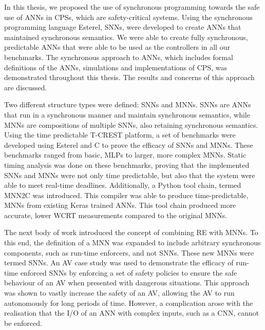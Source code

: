 In this thesis, we proposed the use of synchronous programming towards the safe use of \acp{ANN} in \acp{CPS}, which are safety-critical systems.
Using the synchronous programming language Esterel, \acp{SNN}, were developed to create \acp{ANN} that maintained synchronous semantics.
We were able to create fully synchronous, predictable \acp{ANN} that were able to be used as the controllers in all our benchmarks.
The synchronous approach to \acp{ANN}, which includes formal definitions of the \acp{ANN}, simulations and implementations of \ac{CPS}, was demonstrated throughout this thesis.
The results and concerns of this approach are discussed.

Two different structure types were defined: \acp{SNN} and \acp{MNN}.
\acp{SNN} are \acp{ANN} that run in a synchronous manner and maintain synchronous semantics, while \acp{MNN} are compositions of multiple \acp{SNN}, also retaining synchronous semantics.
Using the time predictable T-CREST platform, a set of benchmarks were developed using Esterel and C to prove the efficacy of \acp{SNN} and \acp{MNN}. 
These benchmarks ranged from basic, \acp{MLP} to larger, more complex \acp{MNN}.
Static timing analysis was done on these benchmarks, proving that the implemented \acp{SNN} and \acp{MNN} were not only time predictable, but also that the system were able to meet real-time deadlines.
Additionally, a Python tool chain, termed \ac{MNN2C} was introduced.
This compiler was able to produce time-predictable, \acp{MNN} from existing Keras trained \acp{ANN}.
This tool chain produced more accurate, lower \ac{WCRT} measurements compared to the original \acp{MNN}.

The next body of work introduced the concept of combining \ac{RE} with \acp{MNN}.
To this end, the definition of a \ac{MNN} was expanded to include arbitrary synchronous components, such as run-time enforcers, and not \acp{SNN}.
These new \acp{MNN} were termed \acp{SNN}.
An \ac{AV} case study was used to demonstrate the efficacy of run-time enforced \acp{SNN} by enforcing a set of safety policies to ensure the safe behaviour of an \ac{AV} when presented with dangerous situations.
This approach was shown to vastly increase the safety of an \ac{AV}, allowing the \ac{AV} to run autonomously for long periods of time.
However, a complication arose with the realisation that the I/O of an \ac{ANN} with complex inputs, such as a \ac{CNN}, cannot be enforced.

